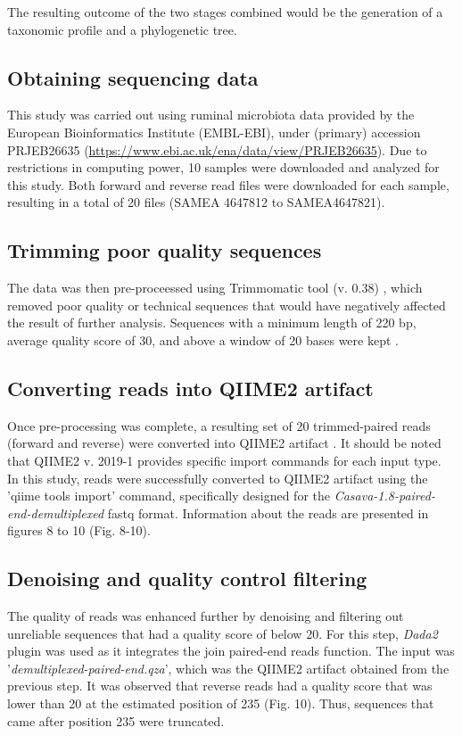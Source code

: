 \documentclass{singlecol-new}
\theoremstyle{TH}{
\newtheorem{lemma}{Lemma}
\newtheorem{theorem}[lemma]{Theorem}
\newtheorem{corrolary}[lemma]{Corrolary}
\newtheorem{conjecture}[lemma]{Conjecture}
\newtheorem{proposition}[lemma]{Proposition}
\newtheorem{claim}[lemma]{Claim}
\newtheorem{stheorem}[lemma]{Wrong Theorem}
\newtheorem{algorithm}{Algorithm}
}
\theoremstyle{THrm}{
\newtheorem{definition}{Definition}[section]
\newtheorem{question}{Question}[section]
\newtheorem{remark}{Remark}
\newtheorem{scheme}{Scheme}
}
\theoremstyle{THhit}{
\newtheorem{case}{Case}[section]
}
\begin{document}
The resulting outcome of the two stages combined would be the generation of a taxonomic profile and a phylogenetic tree.

\subsection{Obtaining sequencing data}

This study was carried out using ruminal microbiota data provided by the European Bioinformatics Institute (EMBL-EBI), under (primary) accession PRJEB26635 (\url{https://www.ebi.ac.uk/ena/data/view/PRJEB26635}). Due to restrictions in computing power, 10 samples were downloaded and analyzed for this study. Both forward and reverse read files were downloaded for each sample, resulting in a total of 20 files (SAMEA 4647812 to SAMEA4647821).

\subsection{Trimming poor quality sequences}

The data was then pre-proceessed using Trimmomatic tool (v. 0.38) \citep{bolger14}, which removed poor quality or technical sequences that would have negatively affected the result of further analysis. Sequences with a minimum length of 220 bp, average quality score of 30, and above a window of 20 bases were kept \citep{lopez2018comparison}.

\subsection{Converting reads into QIIME2 artifact}

Once pre-processing was complete, a resulting set of 20 trimmed-paired reads (forward and reverse) were converted into QIIME2 artifact \citep{qiime2}. It should be noted that QIIME2 v. 2019-1 provides specific import commands for each input type. In this study, reads were successfully converted to QIIME2 artifact using the 'qiime tools import' command, specifically designed for the \textit{Casava-1.8-paired-end-demultiplexed} fastq format. Information about the reads are presented in figures 8 to 10 (Fig. 8-10). 

\subsection{Denoising and quality control filtering}

The quality of reads was enhanced further by denoising and filtering out unreliable sequences that had a quality score of below 20. For this step, \textit{Dada2} plugin was used as it integrates the join paired-end reads function. The input was '\textit{demultiplexed-paired-end.qza}', which was the QIIME2 artifact obtained from the previous step. It was observed that reverse reads had a quality score that was lower than 20 at the estimated position of 235 (Fig. 10). Thus, sequences that came after position 235 were truncated. \\
\end{document}
